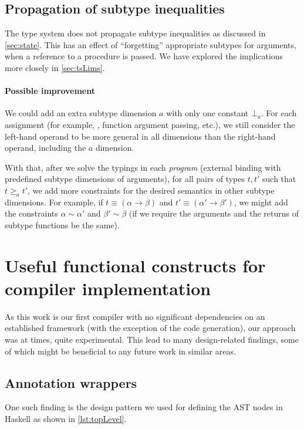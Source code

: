 \subsection{Propagation of subtype inequalities}
\label{sec:weakness}

The type system does not propagate subtype inequalities as discussed in \cref{sec:state}. This has an effect of ``forgetting'' appropriate subtypes for arguments, when a reference to a procedure is passed. We have explored the implications more closely in \cref{sec:tsLims}.

\paragraph{Possible improvement}
We could add an extra subtype dimension $a$ with only one constant $\bot_a$. For each assignment (for example, , function argument passing, etc.), we still consider the left-hand operand to be more general in all dimensions than the right-hand operand, including the $a$ dimension.

With that, after we solve the typings in each \emph{program} (external binding with predefined subtype dimensions of arguments), for all pairs of types $t, t'$ such that $t \geq_a t'$, we add more constraints for the desired semantics in other subtype dimensions. For example, if $t \equiv (\alpha \to \beta)$ and $t' \equiv (\alpha' \to \beta')$, we might add the constraints $\alpha \sim \alpha'$ and $\beta' \sim \beta$ (if we require the arguments and the returns of subtype functions be the same).

\section{Useful functional constructs for compiler implementation}

As this work is our first compiler with no significant dependencies on an established framework (with the exception of the code generation), our approach was at times, quite experimental. This lead to many design-related findings, some of which might be beneficial to any future work in similar areas.

\subsection{Annotation wrappers}
\label{sec:annotations}

One such finding is the design pattern we used for defining the AST nodes in Haskell as shown in \cref{lst:topLevel}.

